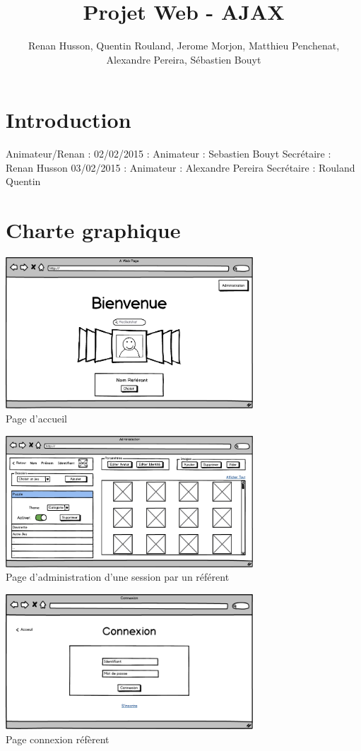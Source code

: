 \documentclass[12pt,a4paper]{report}
\author{Renan Husson, Quentin Rouland, Jerome Morjon, Matthieu Penchenat, Alexandre Pereira, Sébastien Bouyt}
\affil{Université Toulouse, Jean Jaurès - L3 MIASHS \\ Document D2 : Conceptio}
\begin{document}
\title{Projet Web - AJAX}
\maketitle
\renewcommand{\contentsname}{Sommaire}
\tableofcontents
\chapter*{Introduction}
Animateur/Renan :
02/02/2015 : Animateur : Sebastien Bouyt Secrétaire : Renan Husson 
03/02/2015 : Animateur : Alexandre Pereira Secrétaire : Rouland Quentin


\chapter{Charte graphique}
\includegraphics[width=350px]{../Maquette/Acceuil.png}\\
Page d’accueil

\includegraphics[width=350px]{../Maquette/Admin.png}\\
Page d’administration d’une session par un référent

\includegraphics[width=350px]{../Maquette/Connexion.png}\\
Page connexion réfèrent
\end{document}
